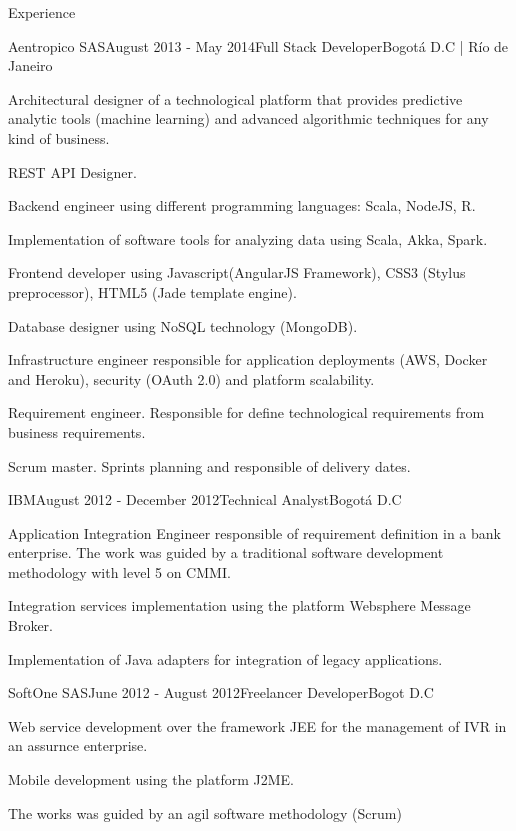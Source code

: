 \documentclass[spanish]{resume}
\begin{document}
\begin{rSection}{Experience}
\begin{rSubsection}{Aentropico SAS}{August 2013 - May 2014}{Full Stack Developer}{Bogot\'a D.C | R\'io de Janeiro}
\item Architectural designer of a technological platform that provides predictive analytic tools (machine learning) and advanced algorithmic techniques for any kind of business.
\item REST API Designer.
\item Backend engineer using different programming languages: Scala, NodeJS, R.
\item Implementation of software tools for analyzing data using Scala, Akka, Spark.
\item Frontend developer using Javascript(AngularJS Framework), CSS3 (Stylus preprocessor), HTML5 (Jade template engine).
\item Database designer using NoSQL technology (MongoDB).
\item Infrastructure engineer responsible for application deployments (AWS, Docker and Heroku), security (OAuth 2.0) and platform scalability.
\item Requirement engineer. Responsible for define technological requirements from business requirements.
\item Scrum master. Sprints planning and responsible of delivery dates.
\end{rSubsection}


\begin{rSubsection}{IBM}{August 2012 - December 2012}{Technical Analyst}{Bogot\'a D.C}
\item Application Integration Engineer responsible of requirement definition in a bank enterprise. The work was guided by a traditional software development methodology with level 5 on CMMI.
\item Integration services implementation using the platform Websphere Message Broker.
\item Implementation of Java adapters for integration of legacy applications.
\end{rSubsection}


\begin{rSubsection}{SoftOne SAS}{June 2012 - August 2012}{Freelancer Developer}{Bogot D.C}
\item Web service development over the framework JEE for the management of IVR in an assurnce enterprise.
\item Mobile development using the platform J2ME.
\item The works was guided by an agil software methodology (Scrum)
\end{rSubsection}

\end{rSection}
\end{document}
